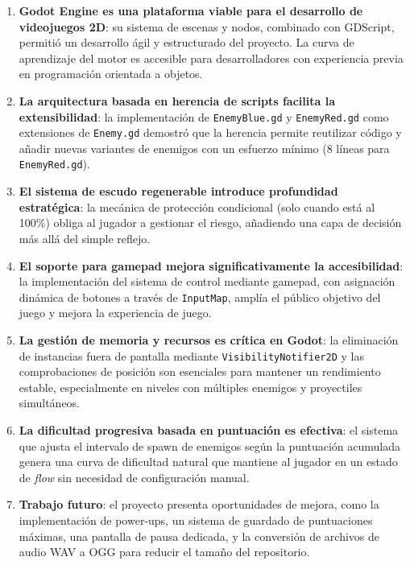 \documentclass[12pt, a4paper, oneside]{report}
\begin{document}
\begin{enumerate}
    \item \textbf{Godot Engine es una plataforma viable para el desarrollo de videojuegos 2D}: su sistema de escenas y nodos, combinado con GDScript, permitió un desarrollo ágil y estructurado del proyecto. La curva de aprendizaje del motor es accesible para desarrolladores con experiencia previa en programación orientada a objetos.

    \item \textbf{La arquitectura basada en herencia de scripts facilita la extensibilidad}: la implementación de \texttt{EnemyBlue.gd} y \texttt{EnemyRed.gd} como extensiones de \texttt{Enemy.gd} demostró que la herencia permite reutilizar código y añadir nuevas variantes de enemigos con un esfuerzo mínimo (8 líneas para \texttt{EnemyRed.gd}).

    \item \textbf{El sistema de escudo regenerable introduce profundidad estratégica}: la mecánica de protección condicional (solo cuando está al 100\%) obliga al jugador a gestionar el riesgo, añadiendo una capa de decisión más allá del simple reflejo.

    \item \textbf{El soporte para gamepad mejora significativamente la accesibilidad}: la implementación del sistema de control mediante gamepad, con asignación dinámica de botones a través de \texttt{InputMap}, amplía el público objetivo del juego y mejora la experiencia de juego.

    \item \textbf{La gestión de memoria y recursos es crítica en Godot}: la eliminación de instancias fuera de pantalla mediante \texttt{VisibilityNotifier2D} y las comprobaciones de posición son esenciales para mantener un rendimiento estable, especialmente en niveles con múltiples enemigos y proyectiles simultáneos.

    \item \textbf{La dificultad progresiva basada en puntuación es efectiva}: el sistema que ajusta el intervalo de spawn de enemigos según la puntuación acumulada genera una curva de dificultad natural que mantiene al jugador en un estado de \textit{flow} sin necesidad de configuración manual.

    \item \textbf{Trabajo futuro}: el proyecto presenta oportunidades de mejora, como la implementación de power-ups, un sistema de guardado de puntuaciones máximas, una pantalla de pausa dedicada, y la conversión de archivos de audio WAV a OGG para reducir el tamaño del repositorio.
\end{enumerate}
\end{document}
